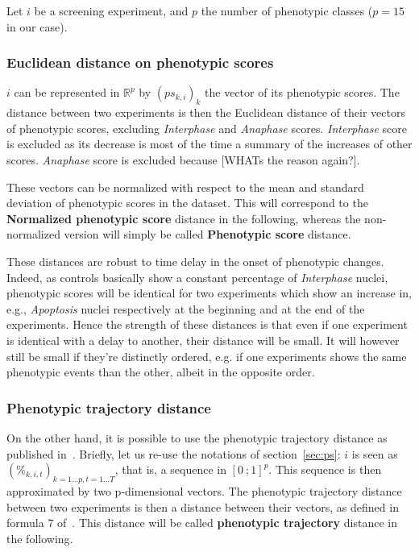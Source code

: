 Let $i$ be a screening experiment, and $p$ the number of phenotypic classes ($p=15$ in our case). 
\subsubsection{Euclidean distance on phenotypic scores}
$i$ can be represented in $\mathbb{R}^p$ by $(ps_{k,i})_k$ the vector of its phenotypic scores. The distance between two experiments is then the Euclidean distance of their vectors of phenotypic scores, excluding \textit{Interphase} and \textit{Anaphase} scores. \textit{Interphase} score is excluded as its decrease is most of the time a summary of the increases of other scores. \textit{Anaphase} score is excluded because [WHATs the reason again?]. 

These vectors can be normalized with respect to the mean and standard deviation of phenotypic scores in the dataset. This will correspond to the \textbf{Normalized phenotypic score} distance in the following, whereas the non-normalized version will simply be called \textbf{Phenotypic score} distance.

These distances are robust to time delay in the onset of phenotypic changes. Indeed, as controls basically show a constant percentage of \textit{Interphase} nuclei, phenotypic scores will be identical for two experiments which show an increase in, e.g., \textit{Apoptosis} nuclei respectively at the beginning and at the end of the experiments. Hence the strength of these distances is that even if one experiment is identical with a delay to another, their distance will be small. It will however still be small if they're distinctly ordered, e.g. if one experiments shows the same phenotypic events than the other, albeit in the opposite order.

\subsubsection{Phenotypic trajectory distance}
On the other hand, it is possible to use the phenotypic trajectory distance as published in~\cite{Walter2010}. Briefly, let us re-use the notations of section~\ref{sec:ps}: $i$ is seen as $(\%_{k,i,t})_{k=1\ldots p,t=1\ldots T}$, that is, a sequence in $[0~;1]^p$. This sequence is then approximated by two p-dimensional vectors. The phenotypic trajectory distance between two experiments is then a distance between their vectors, as defined in formula 7 of~\cite{Walter2010}. This distance will be called \textbf{phenotypic trajectory} distance in the following.

